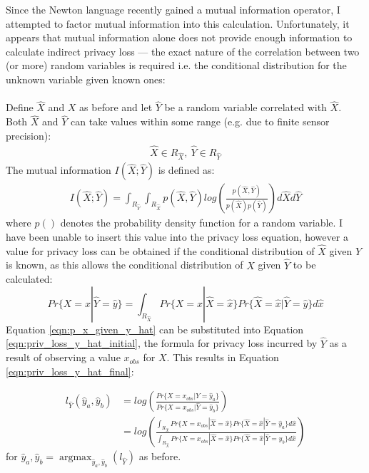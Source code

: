 \documentclass[12pt]{article}
\DeclareMathOperator*{\argmax}{argmax}
\begin{document}
\begin{appendix}
    Since the Newton language recently gained a mutual information operator, I attempted to factor mutual information into this calculation. Unfortunately, it appears that mutual information alone does not provide enough information to calculate indirect privacy loss --- the exact nature of the correlation between two (or more) random variables is required i.e. the conditional distribution for the unknown variable given known ones:
    \\
    \\
    Define $\hat{X}$ and $X$ as before and let $\hat{Y}$ be a random variable correlated with $\hat{X}$. Both $\hat{X}$ and $\hat{Y}$ can take values within some range (e.g. due to finite sensor precision):
    \begin{align*}
      \hat{X} \in R_{\hat{X}},\ \hat{Y} \in R_{\hat{Y}}
    \end{align*}
    The mutual information $I(\hat{X};\hat{Y})$ is defined as:
    \begin{align}
      I(\hat{X};\hat{Y}) = \int_{R_{\hat{Y}}} \int_{R_{\hat{X}}} p(\hat{X}, \hat{Y}) log \left( \frac{p(\hat{X}, \hat{Y})}{p(\hat{X})p(\hat{Y})} \right) d\hat{X} d\hat{Y}
    \end{align}
    where $p()$ denotes the probability density function for a random variable. I have been unable to insert this value into the privacy loss equation, however a value for privacy loss can be obtained if the conditional distribution of $\hat{X}$ given $\hat{Y}$ is known, as this allows the conditional distribution of $X$ given $\hat{Y}$ to be calculated:
    \begin{equation}
      Pr\{X = x | \hat{Y} = \hat{y}\} = \int_{R_{\hat{X}}}Pr\{X = x | \hat{X} = \hat{x}\} Pr\{\hat{X} = \hat{x} | \hat{Y} = \hat{y}\} d \hat{x} \label{eqn:p_x_given_y_hat}
    \end{equation}
    Equation \ref{eqn:p_x_given_y_hat} can be substituted into Equation \ref{eqn:priv_loss_y_hat_initial}, the formula for privacy loss incurred by $\hat{Y}$ as a result of observing a value $x_{obs}$ for $X$. This results in Equation \ref{eqn:priv_loss_y_hat_final}:

    \begin{align}
      l_{\hat{Y}}(\hat{y}_a, \hat{y}_b) & = log \left( \frac{Pr\{X = x_{obs} | \hat{Y} = \hat{y}_a\}}{Pr\{X = x_{obs} | \hat{Y} = \hat{y}_b\}} \right) \label{eqn:priv_loss_y_hat_initial} \\
      & = log \left( \frac{\int_{R_{\hat{X}}} Pr\{X = x_{obs}| \hat{X} = \hat{x}\} Pr\{\hat{X}=\hat{x}|\hat{Y} = \hat{y}_a\} d\hat{x} }{\int_{R_{\hat{X}}} Pr\{X = x_{obs}| \hat{X} = \hat{x}\} Pr\{\hat{X}=\hat{x}|\hat{Y} = \hat{y}_b\} d\hat{x} }\right) \label{eqn:priv_loss_y_hat_final}
    \end{align}
    for $\hat{y}_a, \hat{y}_b = \argmax_{\hat{y}_a, \hat{y}_b}(l_{\hat{Y}})$ as before.


\end{appendix}
\end{document}
